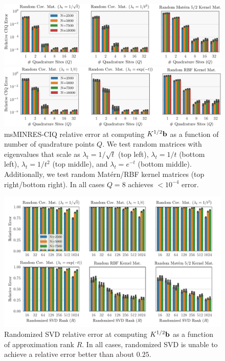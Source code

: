 \begin{figure}[t!]
	\centering
	\includegraphics[width=\textwidth]{figures/quad_error.pdf}

	\includegraphics[width=\textwidth]{figures/quad_error_supp.pdf}
  \caption[
    Relative error of msMINRES-CIQ as a function of number of quadrature points $Q$.
  ]{
    msMINRES-CIQ relative error at computing $K^{1/2} \mathbf{b}$ as a function of number of quadrature points $Q$.
    We test random matrices with eigenvalues that scale as $\lambda_t = 1/\sqrt{t}$ (top left), $\lambda_t = 1/t$ (bottom left), $\lambda_t = 1/{t}^2$ (top middle), and $\lambda_t = e^{-t}$ (bottom middle).
    Additionally, we test random Mat\'ern/RBF kernel matrices (top right/bottom right).
    In all cases $Q=8$ achieves $<10^{-4}$ error.
  }
  \label{fig:quad_error}
\end{figure}

\begin{figure}[ht!]
	\centering
	\includegraphics[width=\textwidth]{figures/randomized_svd_error_supp.pdf}
  \caption[
    Relative error of randomized SVD as a function of rank $R$.
  ]{
    Randomized SVD relative error at computing $K^{1/2} \mathbf{b}$ as a function of approximation rank $R$.
    In all cases, randomized SVD is unable to achieve a relative error better than about $0.25$.
  }
  \label{fig:randomized_svd_supp}
\end{figure}

